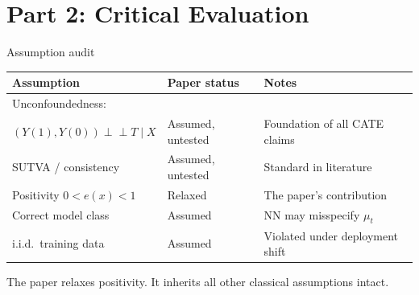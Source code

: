 \documentclass[aspectratio=169]{beamer}
\newcommand{\indep}{\perp\!\!\!\perp}
\begin{document}
\section{Part 2: Critical Evaluation}

\begin{frame}{Assumption audit}

\begin{center}
\renewcommand{\arraystretch}{1.3}
\small
\begin{tabular}{p{5.5cm}p{2.8cm}p{3.5cm}}
\toprule
Assumption & Paper status & Notes \\
\midrule
Unconfoundedness:\\
$(Y(1),Y(0))\indep T\mid X$
  & \alert{Assumed, untested}
  & Foundation of all CATE claims \\
SUTVA / consistency
  & \alert{Assumed, untested}
  & Standard in literature \\
Positivity $0 < e(x) < 1$
  & \textcolor{green!60!black}{Relaxed}
  & The paper's contribution \\
Correct model class
  & \alert{Assumed}
  & NN may misspecify $\mu_t$ \\
i.i.d.\ training data
  & \alert{Assumed}
  & Violated under deployment shift \\
\bottomrule
\end{tabular}
\end{center}

\bigskip
\begin{alertblock}{}
The paper relaxes positivity. It inherits all other classical assumptions intact.
\end{alertblock}
\end{frame}
\end{document}
